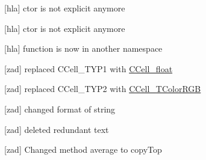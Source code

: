 \begin{DoxyRefList}
%
\mbox{[}hla\mbox{]} ctor is not explicit anymore  
\item[Member \mbox{\hyperlink{class_c_priority_queue_a9b34cd06cb80b6a0a6b07cbafc3360f3}{C\+Priority\+Queue\+::operator$<$$<$}} (std\+::ostream \&a\+O\+Stream, const \mbox{\hyperlink{class_c_priority_queue}{C\+Priority\+Queue}} \&a\+Queue)]\label{bugfix__bugfix000009}%
%
\mbox{[}hla\mbox{]} ctor is not explicit anymore  
\item[Member \mbox{\hyperlink{namespace_c_cell__tools_aa21306bda597e46c1a475f84277af673}{C\+Cell\+\_\+tools\+::deep\+Copy\+List\+Remainder}} (const C\+Cell $\ast$a\+Cell)]\label{bugfix__bugfix000010}%
%
\mbox{[}hla\mbox{]} function is now in another namespace  
\item[page \mbox{\hyperlink{index}{Úvod a zadání}} ]\label{bugfix__bugfix000012}%
%
\mbox{[}zad\mbox{]} replaced {\ttfamily C\+Cell\+\_\+\+T\+Y\+P1} with {\ttfamily \mbox{\hyperlink{namespace_c_cell__float}{C\+Cell\+\_\+float}}}

\label{bugfix__bugfix000013}%
%
\mbox{[}zad\mbox{]} replaced {\ttfamily C\+Cell\+\_\+\+T\+Y\+P2} with {\ttfamily \mbox{\hyperlink{namespace_c_cell___t_color_r_g_b}{C\+Cell\+\_\+\+T\+Color\+R\+GB}}}

\label{bugfix__bugfix000014}%
%
\mbox{[}zad\mbox{]} changed format of string

\label{bugfix__bugfix000015}%
%
\mbox{[}zad\mbox{]} deleted redundant text

\label{bugfix__bugfix000016}%
%
\mbox{[}zad\mbox{]} Changed method average to copy\+Top
\end{DoxyRefList}
